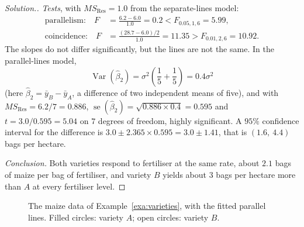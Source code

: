 \documentclass[11pt,a4paper]{article}
\numberwithin{equation}{section}
\theoremstyle{definition}
\newenvironment{solution}
  {\renewcommand{\qedsymbol}{}\begin{proof}[\textit{Solution}.]}
  {\end{proof}}
\begin{document}
\begin{solution}
\emph{Tests}, with $MS_{\mathrm{Res}} = 1.0$ from the separate-lines model:
\begin{align*}
\text{parallelism:}\quad F &= \frac{6.2 - 6.0}{1.0} = 0.2 < F_{0.05,1,6} = 5.99 , \\
\text{coincidence:}\quad F &= \frac{(28.7 - 6.0)/2}{1.0} = 11.35 > F_{0.01,2,6} = 10.92 .
\end{align*}
The slopes do not differ significantly, but the lines are not the same. In the parallel-lines model,
\[
\operatorname{Var}(\hat\beta_2) = \sigma^2\left(\frac{1}{5} + \frac{1}{5}\right) = 0.4\sigma^2
\]
(here $\hat\beta_2 = \bar y_B - \bar y_A$, a difference of two independent means of five), and with
$MS_{\mathrm{Res}} = 6.2/7 = 0.886$, $\operatorname{se}(\hat\beta_2) = \sqrt{0.886 \times 0.4} = 0.595$ and
$t = 3.0/0.595 = 5.04$ on $7$ degrees of freedom, highly significant. A $95\%$ confidence interval for the
difference is $3.0 \pm 2.365 \times 0.595 = 3.0 \pm 1.41$, that is $(1.6,\ 4.4)$ bags per hectare.

\emph{Conclusion.} Both varieties respond to fertiliser at the same rate, about $2.1$ bags of maize per bag of
fertiliser, and variety $B$ yields about $3$ bags per hectare more than $A$ at every fertiliser level.
\end{solution}

\begin{figure}[H]
\centering
{}
\caption{The maize data of Example~\ref{exa:varieties}, with the fitted parallel lines. Filled circles:
variety $A$; open circles: variety $B$.}
\label{fig:varieties}
\end{figure}
\end{document}
